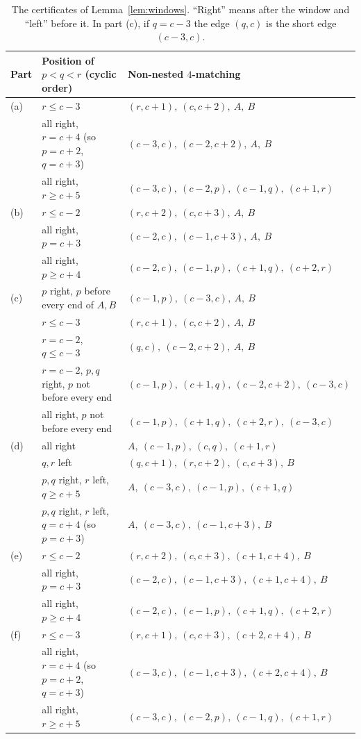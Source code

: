 \documentclass[11pt]{amsart}
\theoremstyle{definition}\newtheorem{problem}{Problem}
\theoremstyle{remark}\newtheorem*{remark}{Remark}
\begin{document}
\begin{table}[ht]
\centering\small
\begin{tabular}{@{}lll@{}}
\toprule
Part & Position of $p<q<r$ (cyclic order) & Non-nested $4$-matching\\
\midrule
(a) & $r\le c-3$ & $(r,c+1),\ (c,c+2),\ A,\ B$\\
    & all right, $r=c+4$ (so $p=c+2$, $q=c+3$) & $(c-3,c),\ (c-2,c+2),\ A,\ B$\\
    & all right, $r\ge c+5$ & $(c-3,c),\ (c-2,p),\ (c-1,q),\ (c+1,r)$\\
\midrule
(b) & $r\le c-2$ & $(r,c+2),\ (c,c+3),\ A,\ B$\\
    & all right, $p=c+3$ & $(c-2,c),\ (c-1,c+3),\ A,\ B$\\
    & all right, $p\ge c+4$ & $(c-2,c),\ (c-1,p),\ (c+1,q),\ (c+2,r)$\\
\midrule
(c) & $p$ right, $p$ before every end of $A,B$ & $(c-1,p),\ (c-3,c),\ A,\ B$\\
    & $r\le c-3$ & $(r,c+1),\ (c,c+2),\ A,\ B$\\
    & $r=c-2$, $q\le c-3$ & $(q,c),\ (c-2,c+2),\ A,\ B$\\
    & $r=c-2$, $p,q$ right, $p$ not before every end & $(c-1,p),\ (c+1,q),\ (c-2,c+2),\ (c-3,c)$\\
    & all right, $p$ not before every end & $(c-1,p),\ (c+1,q),\ (c+2,r),\ (c-3,c)$\\
\midrule
(d) & all right & $A,\ (c-1,p),\ (c,q),\ (c+1,r)$\\
    & $q,r$ left & $(q,c+1),\ (r,c+2),\ (c,c+3),\ B$\\
    & $p,q$ right, $r$ left, $q\ge c+5$ & $A,\ (c-3,c),\ (c-1,p),\ (c+1,q)$\\
    & $p,q$ right, $r$ left, $q=c+4$ (so $p=c+3$) & $A,\ (c-3,c),\ (c-1,c+3),\ B$\\
\midrule
(e) & $r\le c-2$ & $(r,c+2),\ (c,c+3),\ (c+1,c+4),\ B$\\
    & all right, $p=c+3$ & $(c-2,c),\ (c-1,c+3),\ (c+1,c+4),\ B$\\
    & all right, $p\ge c+4$ & $(c-2,c),\ (c-1,p),\ (c+1,q),\ (c+2,r)$\\
\midrule
(f) & $r\le c-3$ & $(r,c+1),\ (c,c+3),\ (c+2,c+4),\ B$\\
    & all right, $r=c+4$ (so $p=c+2$, $q=c+3$) & $(c-3,c),\ (c-1,c+3),\ (c+2,c+4),\ B$\\
    & all right, $r\ge c+5$ & $(c-3,c),\ (c-2,p),\ (c-1,q),\ (c+1,r)$\\
\bottomrule
\end{tabular}
\caption{The certificates of Lemma~\ref{lem:windows}. ``Right'' means after the window and ``left'' before it. In part
(c), if $q=c-3$ the edge $(q,c)$ is the short edge $(c-3,c)$.}
\label{tab:windows}
\end{table}
\end{document}
